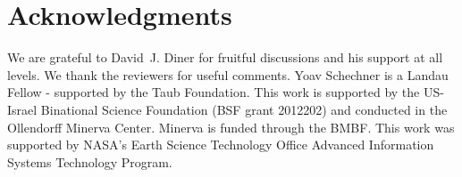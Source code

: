 \documentclass[10pt,letterpaper]{article}
\begin{document}

\section*{Acknowledgments}
\label{sec:acknowledgments}


We are grateful to David~J. Diner for fruitful discussions and his support at all
levels. We thank the reviewers for useful comments. Yoav Schechner is a Landau
Fellow - supported by the Taub Foundation. This work is supported by the
US-Israel Binational Science Foundation (BSF grant 2012202) and conducted in the
Ollendorff Minerva Center. Minerva is funded through the BMBF. This work was supported
by NASA's Earth Science Technology Office Advanced Information Systems Technology Program. 

\theendnotes
\end{document}
